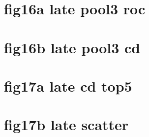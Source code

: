 \documentclass{article}
\begin{document}
\section*{fig16a late pool3 roc}
\resizebox{\linewidth}{!}{}
\clearpage
\section*{fig16b late pool3 cd}
\resizebox{\linewidth}{!}{}
\clearpage
\section*{fig17a late cd top5}
\resizebox{\linewidth}{!}{}
\clearpage
\section*{fig17b late scatter}
\resizebox{\linewidth}{!}{}
\clearpage
\end{document}
